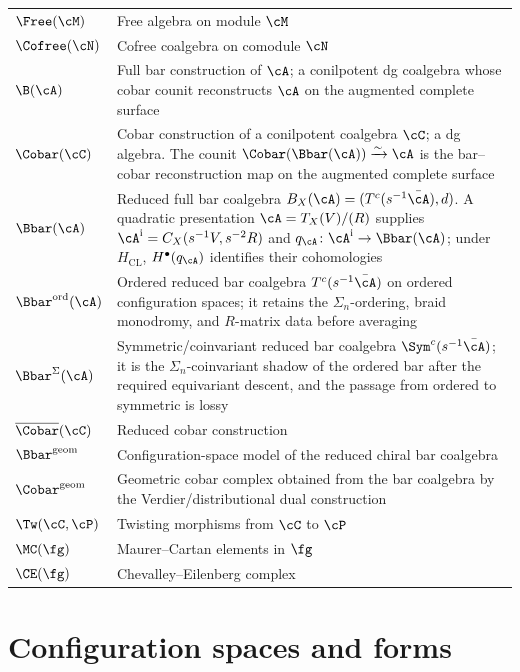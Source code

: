 \begin{longtable}{p{3cm} p{10cm}}
%
$\Free(\cM)$ & Free algebra on module $\cM$ \\
$\Cofree(\cN)$ & Cofree coalgebra on comodule $\cN$ \\
$\B(\cA)$ & Full bar construction of $\cA$; a conilpotent dg coalgebra whose cobar counit reconstructs $\cA$ on the augmented complete surface \\
$\Cobar(\cC)$ & Cobar construction of a conilpotent coalgebra $\cC$; a dg algebra.  The counit $\Cobar(\Bbar(\cA)) \xrightarrow{\sim} \cA$ is the bar--cobar reconstruction map on the augmented complete surface \\
$\Bbar(\cA)$ & Reduced full bar coalgebra $B_X(\cA)=(T^c(s^{-1}\bar{\cA}),d)$.  A quadratic presentation $\cA=T_X(V)/(R)$ supplies $\cA^{\mathrm i}=C_X(s^{-1}V,s^{-2}R)$ and $q_\cA\colon\cA^{\mathrm i}\to\Bbar(\cA)$; under $H_{\mathrm{CL}}$, $H^\bullet(q_\cA)$ identifies their cohomologies \\
$\Bbar^{\mathrm{ord}}(\cA)$ & Ordered reduced bar coalgebra $T^c(s^{-1}\bar{\cA})$ on ordered configuration spaces; it retains the $\Sigma_n$-ordering, braid monodromy, and $R$-matrix data before averaging \\
$\Bbar^{\Sigma}(\cA)$ & Symmetric/coinvariant reduced bar coalgebra $\Sym^c(s^{-1}\bar{\cA})$; it is the $\Sigma_n$-coinvariant shadow of the ordered bar after the required equivariant descent, and the passage from ordered to symmetric is lossy \\
%
$\overline{\Cobar}(\cC)$ & Reduced cobar construction \\
$\Bbar^{\mathrm{geom}}$ & Configuration-space model of the reduced chiral bar coalgebra \\
$\Cobar^{\mathrm{geom}}$ & Geometric cobar complex obtained from the bar coalgebra by the Verdier/distributional dual construction \\
$\Tw(\cC, \cP)$ & Twisting morphisms from $\cC$ to $\cP$ \\
$\MC(\fg)$ & Maurer--Cartan elements in $\fg$ \\
$\CE(\fg)$ & Chevalley--Eilenberg complex \\
\end{longtable}


\section{Configuration spaces and forms}
\label{sec:notation-config}

